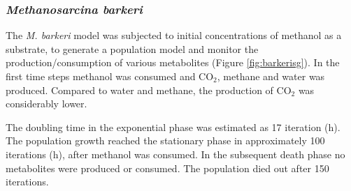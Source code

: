 \subsubsection{\textit{Methanosarcina barkeri}}
The \textit{M. barkeri} model was subjected to initial concentrations of methanol as a substrate, to generate a population model and monitor the production/consumption of various metabolites (Figure \hyperref[fig:barkerisg]{\ref{fig:barkerisg}}). In the first time steps methanol was consumed and CO$_2$, methane and water was produced. Compared to water and methane, the production of CO$_2$ was considerably lower.

The doubling time in the exponential phase was estimated as 17 iteration (h).
The population growth reached the stationary phase in approximately 100 iterations (h), after methanol was consumed. In the subsequent death phase no metabolites were produced or consumed. The population died out after 150 iterations.

